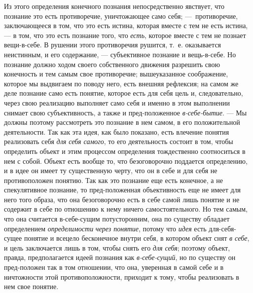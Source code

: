 \documentclass[twoside]{article}
\begin{document}
{Из этого определения конечного познания непосредственно
явствует, что познание это есть противоречие, уничтожающее само себя;
—~противоречие, заключающееся в том, что это есть истина,
которая вместе с тем не есть истина, — в том, что это есть
познание того, что {\em есть},
которое вместе с тем не познает вещи-в-себе. В рушении этого
противоречия рушится, т.~е. оказывается неистинным, и его содержание, —
субъективное познание и вещь-в-себе. Но познание должно ходом
своего собственного движения разрешить свою конечность и тем самым свое
противоречие; вышеуказанное соображение, которое мы выдвигаем по поводу
него, есть внешняя рефлексия; на самом же деле познание само есть понятие,
которое есть для себя цель и, следовательно, через свою реализацию
выполняет само себя и именно в этом выполнении снимает свою субъективность,
а также и пред-положенное
{\em в-себе-бытие}.
— Мы должны поэтому рассмотреть это познание в нем самом, в
его положительной деятельности. Так как эта идея, как было показано, есть
влечение понятия реализовать себя
{\em для себя самого}, то
его деятельность состоит в том, чтобы определить объект и этим процессом
определения тождественно соотноситься в нем с собой. Объект есть вообще то,
что безоговорочно поддается определению, и в идее он имеет ту существенную
черту, что он в себе и для себя не противоположен понятию. Так как это
познание еще есть конечное, а не спекулятивное познание, то пред-положенная
объективность еще не имеет для него того образа, что она безоговорочно есть
в себе самой лишь понятие и не содержит в себе по отношению к нему ничего
самостоятельного. Но тем самым, что она считается в-себе-сущим
потусторонним, она по существу обладает определением
{\em определимости}
{\em через понятие},
потому что {\em идея}
есть для-себя-сущее понятие и всецело бесконечное внутри
себя, в котором объект снят {\em в
себе}, и цель заключается лишь в том, чтобы снять его
{\em для себя}; поэтому
объект, правда, предполагается идеей познания как
{\em в-себе-сущий}, но по
существу он пред-положен так в том отношении, что она,
уверенная в самой себе и в ничтожности этой
противоположности, приходит к тому, чтобы реализовать в нем свое понятие.

}
\end{document}
